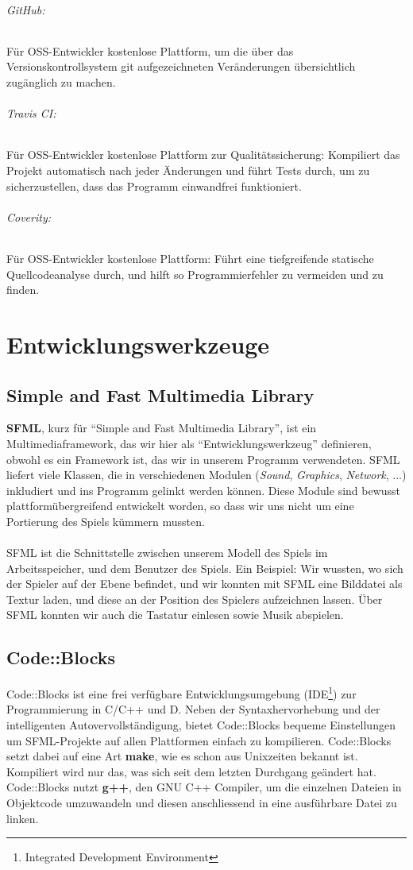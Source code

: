 \documentclass[11pt,a4paper]{scrbook}
\newcommand{\q}[1]{``#1''}
\begin{document}
\subparagraph{GitHub:}
Für OSS-Entwickler kostenlose Plattform, um die über das Versionskontrollsystem git aufgezeichneten Veränderungen übersichtlich zugänglich zu machen.

\subparagraph{Travis CI:}
Für OSS-Entwickler kostenlose Plattform zur Qualitätssicherung: Kompiliert das Projekt automatisch nach jeder Änderungen und führt Tests durch, um zu sicherzustellen, dass das Programm einwandfrei funktioniert.

\subparagraph{Coverity:}
Für OSS-Entwickler kostenlose Plattform: Führt eine tiefgreifende statische Quellcodeanalyse durch, und hilft so Programmierfehler zu vermeiden und zu finden.

\chapter{Entwicklungswerkzeuge}
\section{Simple and Fast Multimedia Library}
\textbf{SFML}, kurz für \q{Simple and Fast Multimedia Library}, ist ein Multimediaframework, das wir hier als
\q{Entwicklungswerkzeug} definieren, obwohl es ein Framework ist, das wir in unserem Programm verwendeten. 
SFML liefert viele Klassen, die in verschiedenen Modulen (\textit{Sound}, \textit{Graphics}, \textit{Network}, ...) inkludiert und ins Programm gelinkt werden können.
Diese Module sind bewusst plattformübergreifend entwickelt worden, so dass wir uns nicht um eine Portierung des Spiels kümmern mussten.
\\
\\
SFML ist die Schnittstelle zwischen unserem Modell des Spiels im Arbeitsspeicher, und dem Benutzer des Spiels. Ein Beispiel:
Wir wussten, wo sich der Spieler auf der Ebene befindet, und wir konnten mit SFML eine Bilddatei als Textur laden, und diese
an der Position des Spielers aufzeichnen lassen. Über SFML konnten wir auch die Tastatur einlesen sowie Musik abspielen.

\section{Code::Blocks}
Code::Blocks ist eine frei verfügbare Entwicklungsumgebung (IDE\footnote{Integrated Development Environment}) zur Programmierung in C/C++ und D.
Neben der Syntaxhervorhebung und der intelligenten Autovervollständigung, bietet Code::Blocks bequeme Einstellungen um SFML-Projekte auf allen Plattformen
einfach zu kompilieren. Code::Blocks setzt dabei auf eine Art \textbf{make}, wie es schon aus Unixzeiten bekannt ist. Kompiliert wird nur das, was sich
seit dem letzten Durchgang geändert hat. Code::Blocks nutzt \textbf{g++}, den GNU C++ Compiler, um die einzelnen Dateien in Objektcode umzuwandeln und diesen
anschliessend in eine ausführbare Datei zu linken.
\end{document}
